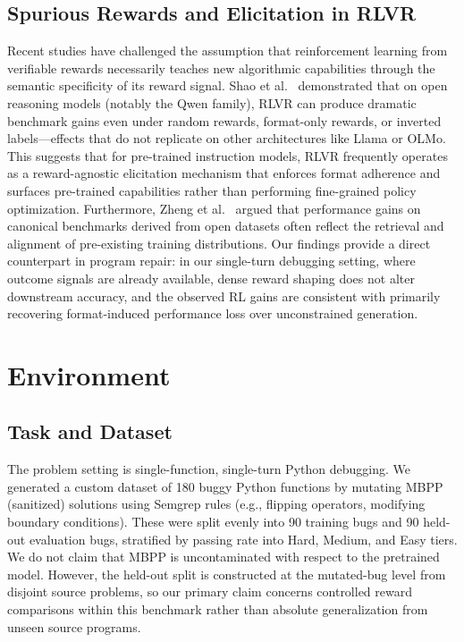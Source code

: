 \documentclass{article}
\begin{document}
\subsection{Spurious Rewards and Elicitation in RLVR}
Recent studies have challenged the assumption that reinforcement learning from verifiable rewards necessarily teaches new algorithmic capabilities through the semantic specificity of its reward signal. Shao et al.~\cite{Shao2025Spurious} demonstrated that on open reasoning models (notably the Qwen family), RLVR can produce dramatic benchmark gains even under random rewards, format-only rewards, or inverted labels—effects that do not replicate on other architectures like Llama or OLMo. This suggests that for pre-trained instruction models, RLVR frequently operates as a reward-agnostic elicitation mechanism that enforces format adherence and surfaces pre-trained capabilities rather than performing fine-grained policy optimization. Furthermore, Zheng et al.~\cite{Zheng2025Contamination} argued that performance gains on canonical benchmarks derived from open datasets often reflect the retrieval and alignment of pre-existing training distributions. Our findings provide a direct counterpart in program repair: in our single-turn debugging setting, where outcome signals are already available, dense reward shaping does not alter downstream accuracy, and the observed RL gains are consistent with primarily recovering format-induced performance loss over unconstrained generation.

\section{Environment}

\subsection{Task and Dataset}
The problem setting is single-function, single-turn Python debugging. We generated a custom dataset of 180 buggy Python functions by mutating MBPP (sanitized) \cite{Austin2021} solutions using Semgrep rules (e.g., flipping operators, modifying boundary conditions). These were split evenly into 90 training bugs and 90 held-out evaluation bugs, stratified by passing rate into Hard, Medium, and Easy tiers. We do not claim that MBPP is uncontaminated with respect to the pretrained model. However, the held-out split is constructed at the mutated-bug level from disjoint source problems, so our primary claim concerns controlled reward comparisons within this benchmark rather than absolute generalization from unseen source programs.
\end{document}
